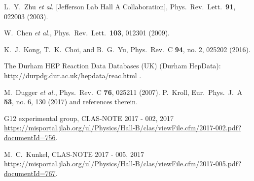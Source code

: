 \documentclass[aps,prc,twocolumn,floatfix,showpacs,preprintnumbers,amsmath,amssymb,superscriptaddress,linenumbers]{revtex4-1}
\begin{document}
\begin{thebibliography}{99}
  L.~Y.~Zhu {\it et al.} [Jefferson Lab Hall A Collaboration],
  Phys.\ Rev.\ Lett.\  {\bf 91}, 022003 (2003).

  W.~Chen {\it et al.},
  Phys.\ Rev.\ Lett.\  {\bf 103}, 012301 (2009).

  K.~J.~Kong, T.~K.~Choi, and B.~G.~Yu,
  Phys.\ Rev.\ C {\bf 94}, no. 2, 025202 (2016).

 The Durham HEP Reaction Data Databases (UK) (Durham 
	HepData): http://durpdg.dur.ac.uk/hepdata/reac.html .

  M.~Dugger {\it et al.},
  Phys.\ Rev.\ C {\bf 76}, 025211 (2007).
P.~Kroll,
Eur.\ Phys.\ J.\ A {\bf 53}, no. 6, 130 (2017) and references therein.

 G12 experimental group, CLAS-NOTE 2017 - 002, 2017 
	\url{https://misportal.jlab.org/ul/Physics/Hall-B/clas/viewFile.cfm/2017-002.pdf?documentId=756}.

 M.~C.~Kunkel,  CLAS-NOTE 2017 - 005, 2017 
	\url{https://misportal.jlab.org/ul/Physics/Hall-B/clas/viewFile.cfm/2017-005.pdf?documentId=767}.


\end{thebibliography}
\end{document}
